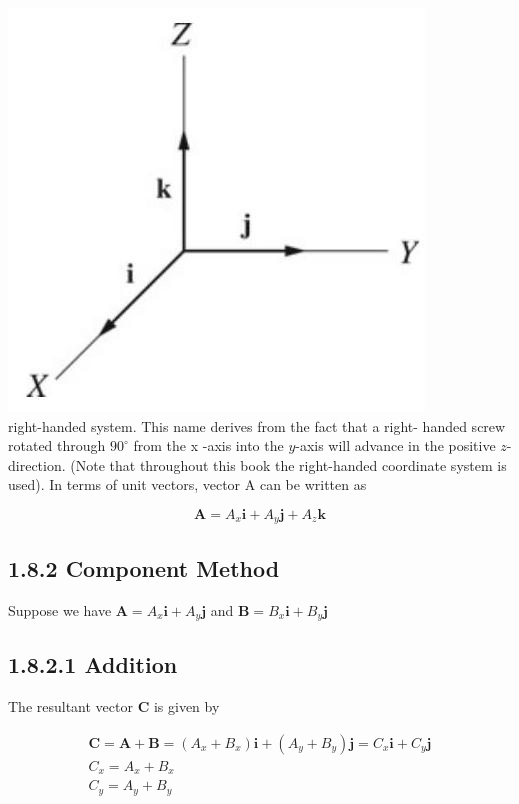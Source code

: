 \documentclass[10pt]{article}
\begin{document}
\includegraphics[max width=\textwidth, center]{2024_09_13_db1f357d2aad0a03eb2eg-019}\\
right-handed system. This name derives from the fact that a right- handed screw rotated through $90^{\circ}$ from the x -axis into the $y$-axis will advance in the positive $z$-direction. (Note that throughout this book the right-handed coordinate system is used). In terms of unit vectors, vector A can be written as

$$
\mathbf{A}=A_{x} \mathbf{i}+A_{y} \mathbf{j}+A_{z} \mathbf{k}
$$

\subsection*{1.8.2 Component Method}
Suppose we have $\mathbf{A}=A_{x} \mathbf{i}+A_{y} \mathbf{j}$ and $\mathbf{B}=B_{x} \mathbf{i}+B_{y} \mathbf{j}$

\subsection*{1.8.2.1 Addition}
The resultant vector $\mathbf{C}$ is given by

$$
\begin{gathered}
\mathbf{C}=\mathbf{A}+\mathbf{B}=\left(A_{x}+B_{x}\right) \mathbf{i}+\left(A_{y}+B_{y}\right) \mathbf{j}=C_{x} \mathbf{i}+C_{y} \mathbf{j} \\
C_{x}=A_{x}+B_{x} \\
C_{y}=A_{y}+B_{y}
\end{gathered}
$$
\end{document}
